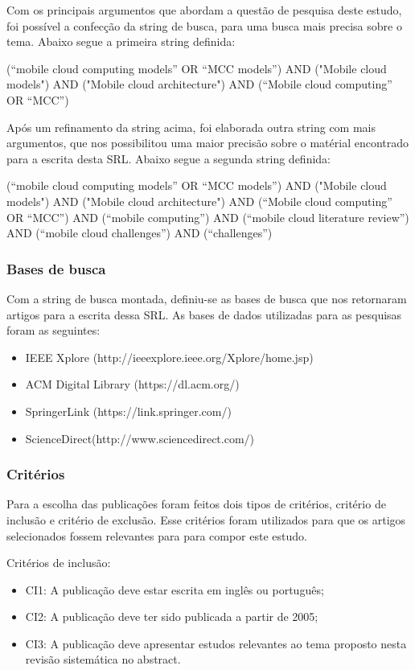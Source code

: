 \documentclass[12pt]{article}
\begin{document}
Com os principais argumentos que abordam a questão de pesquisa deste estudo, foi possível a confecção da string de busca,
para uma busca mais precisa sobre o tema. Abaixo segue a primeira string definida:

(“mobile cloud computing models” OR “MCC models”) AND ("Mobile cloud models") AND ("Mobile cloud architecture") AND (“Mobile cloud computing” OR “MCC”)

Após um refinamento da string acima, foi elaborada outra string com mais argumentos, que nos possibilitou uma maior precisão sobre o matérial encontrado
para a escrita desta SRL. Abaixo segue a segunda string definida:

(“mobile cloud computing models” OR “MCC models”) AND ("Mobile cloud models") AND ("Mobile cloud architecture") AND (“Mobile cloud computing” OR “MCC”) AND (“mobile computing”) AND (“mobile cloud literature review”) AND (“mobile cloud challenges”) AND (“challenges”)

\subsubsection{Bases de busca}

Com a string de busca montada, definiu-se as bases de busca que nos retornaram artigos para a escrita dessa SRL. As bases de 
dados utilizadas para as pesquisas foram as seguintes:

\begin{itemize}
  \item IEEE Xplore (http://ieeexplore.ieee.org/Xplore/home.jsp)
  \item ACM Digital Library (https://dl.acm.org/)
  \item SpringerLink (https://link.springer.com/)
  \item ScienceDirect(http://www.sciencedirect.com/)
\end{itemize}

\subsubsection{Critérios}

Para a escolha das publicações foram feitos dois tipos de critérios, critério de inclusão e critério de exclusão.
Esse critérios foram utilizados para que os artigos selecionados fossem relevantes para para compor este estudo.

Critérios de inclusão:

\begin{itemize}
  \item CI1: A publicação deve estar escrita em inglês ou português;
  \item CI2: A publicação deve ter sido publicada a partir de 2005;
  \item CI3: A publicação deve apresentar estudos relevantes ao tema proposto nesta revisão sistemática no abstract.
\end{itemize}
\end{document}
